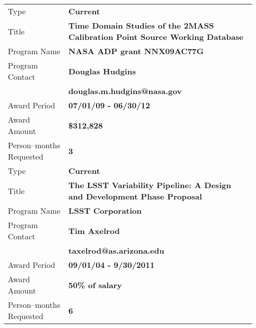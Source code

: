 \begin{tabular}{lp{3.5in}}
Type & {\bf Current} \\
Title & {\bf Time Domain Studies of the 2MASS Calibration Point Source Working Database} \\
Program Name & {\bf NASA ADP grant NNX09AC77G} \\
Program Contact & {\bf Douglas Hudgins} \\ & {\bf douglas.m.hudgins@nasa.gov} \\
Award Period & {\bf 07/01/09 - 06/30/12} \\
Award Amount & {\bf \$312,828} \\
Person--months Requested & {\bf 3} \\
\hline

Type & {\bf Current} \\
Title & {\bf The LSST Variability Pipeline: A Design and Development Phase Proposal} \\
Program Name & {\bf LSST Corporation} \\
Program Contact & {\bf Tim Axelrod} \\ & {\bf taxelrod@as.arizona.edu} \\
Award Period & {\bf 09/01/04 - 9/30/2011} \\
Award Amount & {\bf 50\% of salary} \\
Person--months Requested & {\bf 6} \\
\hline

\end{tabular}
